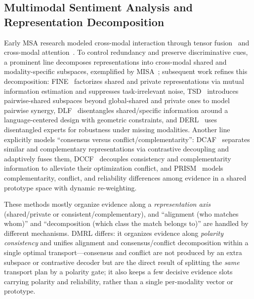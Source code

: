 \documentclass[conference]{IEEEtran}
\begin{document}
\subsection{Multimodal Sentiment Analysis and Representation Decomposition}
Early MSA research modeled cross-modal interaction through tensor
fusion~\cite{zadeh2017tensor} and cross-modal attention~\cite{tsai2019mult}. To
control redundancy and preserve discriminative cues, a prominent line decomposes
representations into cross-modal shared and modality-specific subspaces, exemplified
by MISA~\cite{hazarika2020misa}; subsequent work refines this decomposition:
FINE~\cite{liu2025fine} factorizes shared and private representations via mutual
information estimation and suppresses task-irrelevant noise, TSD~\cite{meng2026tsd}
introduces pairwise-shared subspaces beyond global-shared and private ones to model
pairwise synergy, DLF~\cite{wang2025dlf} disentangles shared/specific information
around a language-centered design with geometric constraints, and
DERL~\cite{li2026derl} uses disentangled experts for robustness under missing
modalities. Another line explicitly models ``consensus versus
conflict/complementarity'': DCAF~\cite{lv2026dcaf} separates similar and
complementary representations via contrastive decoupling and adaptively fuses them,
DCCF~\cite{zhou2025dccf} decouples consistency and complementarity information to
alleviate their optimization conflict, and PRISM~\cite{su2026prism} models
complementarity, conflict, and reliability differences among evidence in a shared
prototype space with dynamic re-weighting.

These methods mostly organize evidence along a \emph{representation axis}
(shared/private or consistent/complementary), and ``alignment (who matches whom)''
and ``decomposition (which class the match belongs to)'' are handled by different
mechanisms. DMRL differs: it organizes evidence along \emph{polarity consistency}
and unifies alignment and consensus/conflict decomposition within a single optimal
transport---consensus and conflict are not produced by an extra subspace or
contrastive decoder but are the direct result of splitting the \emph{same} transport
plan by a polarity gate; it also keeps a few decisive evidence slots carrying
polarity and reliability, rather than a single per-modality vector or prototype.
\end{document}
